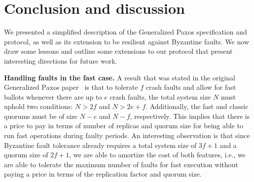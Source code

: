 \vspace{-0.3cm}

\section{Conclusion and discussion}
\vspace{-0.2cm}
\label{sec:disc}
%
We presented a simplified description of the Generalized Paxos specification and protocol, as well as its extension to be resilient against Byzantine faults.
We now draw some lessons and outline some extensions to our protocol that present interesting directions for future work.


\noindent \textbf{Handling faults in the fast case.}
A result that was stated in the original Generalized Paxos
paper~\cite{Lamport2005} is that to tolerate $f$ crash faults and
allow for fast ballots whenever there are up to $e$ crash faults, the
total system size $N$ must uphold two conditions:
$N > 2f$ and $N > 2e+f$.
Additionally, the fast and classic quorums must be of size $N-e$ and $N-f$, respectively. This implies that there is a price to pay in terms of number of replicas and quorum size for being able to run fast operations during faulty periods.
An interesting observation is that since Byzantine fault tolerance already requires a total system size of $3f+1$ and a quorum size of $2f+1$, we are able to amortize the cost of both features, i.e., we are able to tolerate the maximum number of faults for fast execution without paying a price in terms of the replication factor and quorum size.


